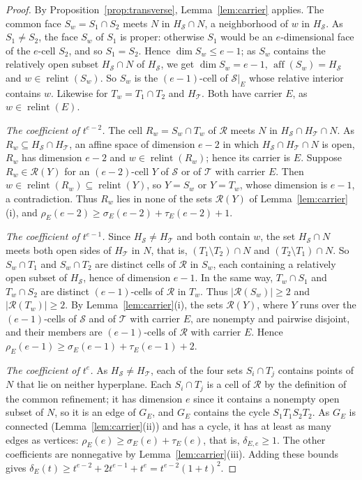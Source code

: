 \documentclass[11pt]{article}
\theoremstyle{definition}
\theoremstyle{remark}
\newcommand{\SSS}{\mathcal S}
\newcommand{\TT}{\mathcal T}
\newcommand{\RR}{\mathcal R}
\newcommand{\relint}{\operatorname{relint}}
\newcommand{\aff}{\operatorname{aff}}
\begin{document}
\begin{proof}
By Proposition~\ref{prop:transverse}, Lemma~\ref{lem:carrier} applies.
The common face $S_w=S_1\cap S_2$ meets $N$ in $H_\SSS\cap N$, a
neighborhood of $w$ in $H_\SSS$. As $S_1\neq S_2$, the face $S_w$ of $S_1$ is proper: otherwise $S_1$ would be an $e$-dimensional face of the $e$-cell $S_2$, and so $S_1=S_2$. Hence $\dim S_w\leq e-1$; as $S_w$ contains the relatively open subset $H_\SSS\cap N$ of $H_\SSS$, we get
$\dim S_w=e-1$, $\aff(S_w)=H_\SSS$ and $w\in\relint(S_w)$. So $S_w$ is the $(e-1)$-cell of
$\SSS|_E$ whose relative interior contains $w$. Likewise for
$T_w=T_1\cap T_2$ and $H_\TT$. Both have carrier $E$, as
$w\in\relint(E)$.

\emph{The coefficient of $t^{e-2}$.} The cell $R_w=S_w\cap T_w$ of $\RR$
meets $N$ in $H_\SSS\cap H_\TT\cap N$. As $R_w\subseteq H_\SSS\cap H_\TT$, an affine space of dimension
$e-2$ in which $H_\SSS\cap H_\TT\cap N$ is open, $R_w$ has dimension $e-2$ and
$w\in\relint(R_w)$; hence its carrier is $E$. Suppose $R_w\in\RR(Y)$ for
an $(e-2)$-cell $Y$ of $\SSS$ or of $\TT$ with carrier $E$. Then
$w\in\relint(R_w)\subseteq\relint(Y)$, so $Y=S_w$ or $Y=T_w$, whose dimension is
$e-1$, a contradiction. Thus $R_w$ lies in none of the
sets $\RR(Y)$ of Lemma~\ref{lem:carrier}(i), and
$\rho_E(e-2)\geq\sigma_E(e-2)+\tau_E(e-2)+1$.

\emph{The coefficient of $t^{e-1}$.} Since $H_\SSS\neq H_\TT$ and both
contain $w$, the set $H_\SSS\cap N$ meets both open sides of $H_\TT$ in $N$,
that is, $(T_1\setminus T_2)\cap N$ and $(T_2\setminus T_1)\cap N$. So $S_w\cap T_1$
and $S_w\cap T_2$ are distinct cells of $\RR$ in $S_w$, each containing
a relatively open subset of $H_\SSS$, hence of dimension $e-1$. In the same way, $T_w\cap S_1$ and
$T_w\cap S_2$ are distinct $(e-1)$-cells of $\RR$ in $T_w$. Thus
$|\RR(S_w)|\geq2$ and $|\RR(T_w)|\geq2$. By Lemma~\ref{lem:carrier}(i), the sets $\RR(Y)$, where $Y$ runs over the $(e-1)$-cells of $\SSS$ and of $\TT$ with carrier $E$, are nonempty and pairwise disjoint, and their members are $(e-1)$-cells of $\RR$ with carrier $E$. Hence $\rho_E(e-1)\geq\sigma_E(e-1)+\tau_E(e-1)+2$.

\emph{The coefficient of $t^{e}$.} As $H_\SSS\neq H_\TT$, each of the four
sets $S_i\cap T_j$ contains points of $N$ that lie on neither hyperplane. Each
$S_i\cap T_j$ is a cell of $\RR$ by the definition of the common
refinement; it has dimension $e$ since it contains a nonempty open subset of $N$, so
it is an edge of $G_E$, and $G_E$ contains the cycle $S_1T_1S_2T_2$. As
$G_E$ is connected (Lemma~\ref{lem:carrier}(ii)) and has a cycle, it has
at least as many edges as vertices: $\rho_E(e)\geq\sigma_E(e)+\tau_E(e)$,
that is, $\delta_{E,e}\geq1$. The other coefficients are nonnegative by
Lemma~\ref{lem:carrier}(iii). Adding these bounds gives
$\delta_E(t)\geq t^{e-2}+2t^{e-1}+t^e=t^{e-2}(1+t)^2$.
\end{proof}
\end{document}
